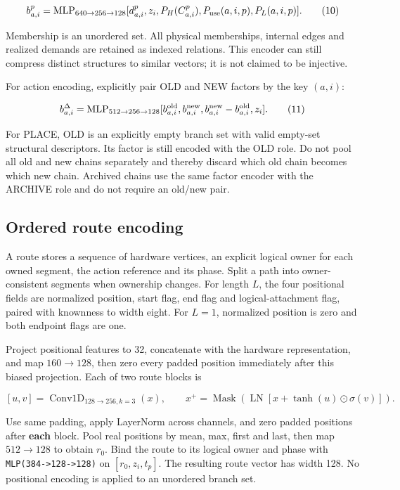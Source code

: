 \documentclass[10pt,a4paper]{article}
\begin{document}
\[
b_{a,i}^{p}=\operatorname{MLP}_{640\to256\to128}
[d_{a,i}^{p},z_i,P_H(C_{a,i}^{p}),P_{\rm use}(a,i,p),P_L(a,i,p)].
\tag{10}
\]

Membership is an unordered set. All physical memberships, internal edges
and realized demands are retained as indexed relations. This encoder can
still compress distinct structures to similar vectors; it is not claimed
to be injective.

For action encoding, explicitly pair OLD and NEW factors by the key
\((a,i)\):

\[
b_{a,i}^{\Delta}=\operatorname{MLP}_{512\to256\to128}
[b_{a,i}^{\rm old},b_{a,i}^{\rm new},b_{a,i}^{\rm new}-b_{a,i}^{\rm old},z_i].
\tag{11}
\]

For PLACE, OLD is an explicitly empty branch set with valid empty-set
structural descriptors. Its factor is still encoded with the OLD role.
Do not pool all old and new chains separately and thereby discard which
old chain becomes which new chain. Archived chains use the same factor
encoder with the ARCHIVE role and do not require an old/new pair.

\hypertarget{ordered-route-encoding}{%
\subsection{Ordered route encoding}\label{ordered-route-encoding}}

A route stores a sequence of hardware vertices, an explicit logical
owner for each owned segment, the action reference and its phase. Split
a path into owner-consistent segments when ownership changes. For length
\(L\), the four positional fields are normalized position, start flag,
end flag and logical-attachment flag, paired with knownness to width
eight. For \(L=1\), normalized position is zero and both endpoint flags
are one.

Project positional features to 32, concatenate with the hardware
representation, and map \(160\to128\), then zero every padded position
immediately after this biased projection. Each of two route blocks is

\[
[u,v]=\operatorname{Conv1D}_{128\to256,k=3}(x),\qquad
x^+=\operatorname{Mask}\left(\operatorname{LN}[x+\tanh(u)\odot\sigma(v)]\right).
\tag{12}
\]

Use same padding, apply LayerNorm across channels, and zero padded
positions after \textbf{each} block. Pool real positions by mean, max,
first and last, then map \(512\to128\) to obtain \(r_0\). Bind the route
to its logical owner and phase with
\texttt{MLP(384-\textgreater{}128-\textgreater{}128)} on
\([r_0,z_i,t_p]\). The resulting route vector has width 128. No
positional encoding is applied to an unordered branch set.
\end{document}

